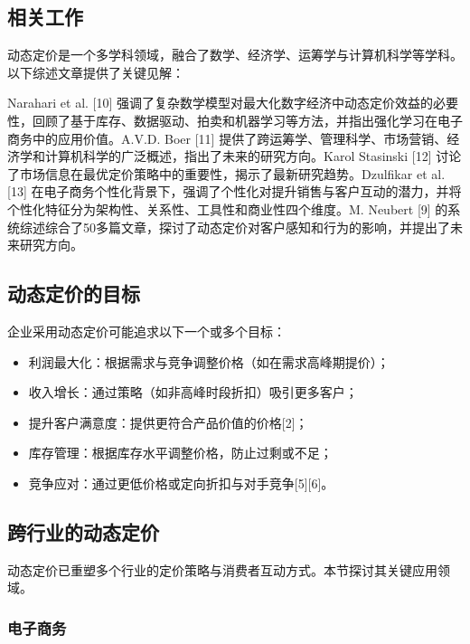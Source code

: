 \subsection{相关工作}\label{iii.-related-works}

动态定价是一个多学科领域，融合了数学、经济学、运筹学与计算机科学等学科。以下综述文章提供了关键见解：

Narahari et al. [10] 强调了复杂数学模型对最大化数字经济中动态定价效益的必要性，回顾了基于库存、数据驱动、拍卖和机器学习等方法，并指出强化学习在电子商务中的应用价值。A.V.D. Boer [11] 提供了跨运筹学、管理科学、市场营销、经济学和计算机科学的广泛概述，指出了未来的研究方向。Karol Stasinski [12] 讨论了市场信息在最优定价策略中的重要性，揭示了最新研究趋势。Dzulfikar et al. [13] 在电子商务个性化背景下，强调了个性化对提升销售与客户互动的潜力，并将个性化特征分为架构性、关系性、工具性和商业性四个维度。M. Neubert [9] 的系统综述综合了50多篇文章，探讨了动态定价对客户感知和行为的影响，并提出了未来研究方向。

\subsection{动态定价的目标}\label{iv.-goals-of-dynamic-pricing}

企业采用动态定价可能追求以下一个或多个目标：
\begin{itemize}
	\item 利润最大化：根据需求与竞争调整价格（如在需求高峰期提价）；
	\item 收入增长：通过策略（如非高峰时段折扣）吸引更多客户；
	\item 提升客户满意度：提供更符合产品价值的价格[2]；
	\item 库存管理：根据库存水平调整价格，防止过剩或不足；
	\item 竞争应对：通过更低价格或定向折扣与对手竞争[5][6]。
\end{itemize}

\subsection{跨行业的动态定价}\label{v.-dynamic-pricing-across-industries}

动态定价已重塑多个行业的定价策略与消费者互动方式。本节探讨其关键应用领域。

\subsubsection{电子商务}\label{a.-e-commerce}

